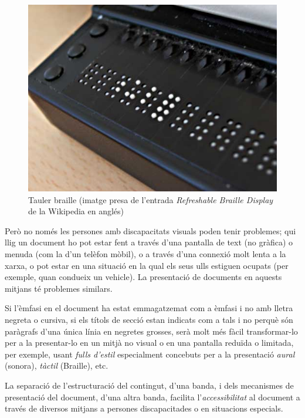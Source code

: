 \begin{figure}
  \centering
  \includegraphics[scale=0.5]{Refreshable_Braille_display.jpg}
  \caption{Tauler braille (imatge presa de l'entrada \emph{Refreshable Braille Display} de la Wikipedia en anglés)}
\end{figure}

Però no només les persones amb discapacitats visuals poden tenir
problemes; qui llig un document ho pot estar fent a través d'una
pantalla de text (no gràfica) o menuda (com la d'un telèfon mòbil), o
a través d'una connexió molt lenta a la xarxa, o pot estar en una
situació en la qual els seus ulls estiguen ocupats (per exemple, quan
condueix un vehicle). La presentació de documents en aquests mitjans
té problemes similars.

Si l'èmfasi en el document ha estat emmagatzemat com a èmfasi i no amb
lletra negreta o cursiva, si els títols de secció estan indicats com a
tals i no perquè són paràgrafs d'una única línia en negretes grosses,
serà molt més fàcil transformar-lo per a la presentar-lo en un mitjà
no visual o en una pantalla reduïda o limitada, per exemple, usant
\emph{fulls d'estil} especialment concebuts per a la presentació
\emph{aural} (sonora), \emph{tàctil} (Braille), etc.

La separació de l'estructuració del contingut, d'una banda, i dels
mecanismes de presentació del document, d'una altra banda, facilita
l'\emph{accessibilitat} al document a través de diversos mitjans a
persones discapacitades o en situacions especials.

